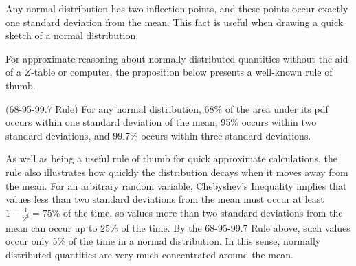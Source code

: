 Any normal distribution has two inflection points, and these points occur exactly one standard deviation from the mean. This fact is useful when drawing a quick sketch of a normal distribution.
\begin{center}
 \end{center}
\par
For approximate reasoning about normally distributed quantities without the aid of a $Z$-table or computer, the proposition below presents a well-known rule of thumb.
\begin{prop}\label{NormalRuleThumb}(68-95-99.7 Rule) For any normal distribution, 68\% of the area under its pdf occurs within one standard deviation of the mean, 95\% occurs within two standard deviations, and 99.7\% occurs within three standard deviations.
\begin{center}
 \end{center}
\end{prop}
\par
As well as being a useful rule of thumb for quick approximate calculations, the rule also illustrates how quickly the distribution decays when it moves away from the mean. For an arbitrary random variable, Chebyshev's Inequality implies that values less than two standard deviations from the mean must occur at least $1-\frac{1}{2^2} = 75\%$ of the time, so values more than two standard deviations from the mean can occur up to $25\%$ of the time. By the 68-95-99.7 Rule above, such values occur only 5\% of the time in a normal distribution. In this sense, normally distributed quantities are very much concentrated around the mean.

